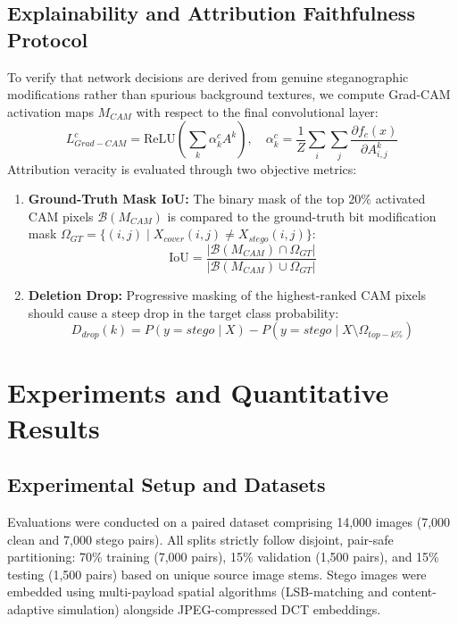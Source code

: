 \documentclass[journal]{IEEEtran}
\begin{document}
\subsection{Explainability and Attribution Faithfulness Protocol}
To verify that network decisions are derived from genuine steganographic modifications rather than spurious background textures, we compute Grad-CAM activation maps $M_{CAM}$ with respect to the final convolutional layer:
\begin{equation}
    L_{Grad-CAM}^c = \text{ReLU}\left( \sum_k \alpha_k^c A^k \right), \quad \alpha_k^c = \frac{1}{Z} \sum_i \sum_j \frac{\partial f_c(x)}{\partial A_{i,j}^k}
\end{equation}
Attribution veracity is evaluated through two objective metrics:
\begin{enumerate}
    \item \textbf{Ground-Truth Mask IoU:} The binary mask of the top $20\%$ activated CAM pixels $\mathcal{B}(M_{CAM})$ is compared to the ground-truth bit modification mask $\Omega_{GT} = \{(i,j) \mid X_{cover}(i,j) \neq X_{stego}(i,j)\}$:
    \begin{equation}
        \text{IoU} = \frac{|\mathcal{B}(M_{CAM}) \cap \Omega_{GT}|}{|\mathcal{B}(M_{CAM}) \cup \Omega_{GT}|}
    \end{equation}
    \item \textbf{Deletion Drop:} Progressive masking of the highest-ranked CAM pixels should cause a steep drop in the target class probability:
    \begin{equation}
        D_{drop}(k) = P(y=stego \mid X) - P(y=stego \mid X \setminus \Omega_{top-k\%})
    \end{equation}
\end{enumerate}

\section{Experiments and Quantitative Results}

\subsection{Experimental Setup and Datasets}
Evaluations were conducted on a paired dataset comprising 14,000 images (7,000 clean and 7,000 stego pairs). All splits strictly follow disjoint, pair-safe partitioning: 70\% training (7,000 pairs), 15\% validation (1,500 pairs), and 15\% testing (1,500 pairs) based on unique source image stems. Stego images were embedded using multi-payload spatial algorithms (LSB-matching and content-adaptive simulation) alongside JPEG-compressed DCT embeddings.
\end{document}
